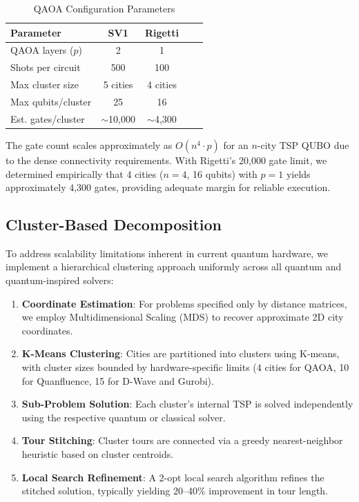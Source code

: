 \documentclass[conference]{IEEEtran}
\begin{document}
\begin{table}[htbp]
\caption{QAOA Configuration Parameters}
\begin{center}
\begin{tabular}{|l|c|c|c|c|}
\hline
\textbf{Parameter} & \textbf{SV1} & \textbf{Rigetti} \\
\hline
QAOA layers ($p$) & 2 & 1 \\
\hline
Shots per circuit & 500 & 100 \\
\hline
Max cluster size & 5 cities & 4 cities \\
\hline
Max qubits/cluster & 25 & 16 \\
\hline
Est. gates/cluster & $\sim$10,000 & $\sim$4,300 \\
\hline
\end{tabular}
\label{tab:qaoa_params}
\end{center}
\end{table}

The gate count scales approximately as $O(n^4 \cdot p)$ for an $n$-city TSP QUBO due to the dense connectivity requirements. With Rigetti's 20,000 gate limit, we determined empirically that 4 cities ($n=4$, 16 qubits) with $p=1$ yields approximately 4,300 gates, providing adequate margin for reliable execution.

\subsection{Cluster-Based Decomposition}

To address scalability limitations inherent in current quantum hardware, we implement a hierarchical clustering approach uniformly across all quantum and quantum-inspired solvers:

\begin{enumerate}
\item \textbf{Coordinate Estimation}: For problems specified only by distance matrices, we employ Multidimensional Scaling (MDS) to recover approximate 2D city coordinates.
\item \textbf{K-Means Clustering}: Cities are partitioned into clusters using K-means, with cluster sizes bounded by hardware-specific limits (4 cities for QAOA, 10 for Quanfluence, 15 for D-Wave and Gurobi).
\item \textbf{Sub-Problem Solution}: Each cluster's internal TSP is solved independently using the respective quantum or classical solver.
\item \textbf{Tour Stitching}: Cluster tours are connected via a greedy nearest-neighbor heuristic based on cluster centroids.
\item \textbf{Local Search Refinement}: A 2-opt local search algorithm refines the stitched solution, typically yielding 20--40\% improvement in tour length.
\end{enumerate}
\end{document}
